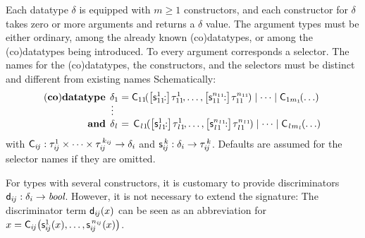 \newcommand\elll{\kern.18ex l\kern.11ex}
\newcommand\elllx{\kern.11ex l\kern.18ex}

Each datatype $\delta$ is equipped with
$m \ge 1$ constructors, and each constructor for $\delta$ takes zero or more
arguments and returns a $\delta$ value. The argument types must be either
ordinary, among the already known (co)datatypes, or among the (co)datatypes
being introduced.
%
To every argument corresponds a selector. The names for the (co)data\-types, the
constructors, and the selectors must be distinct and different from
existing names%
Schematically:
%
\[
\begin{aligned}[t]
\!(\keyw{co})\keyw{datatype}\;\,
  \delta_1 & {}= \smash{\const{C}_{11\!}(\bigl[\const{s}_{11\!}^1{:}\bigr]\vthinspace \tau_{11\!}^1, \ldots, \bigl[\const{s}_{11\!}^{n_{11\!}}{:}\bigr]\vthinspace \tau_{11\!}^{n_{11\!}})} \mid \cdots \mid \smash{\const{C}_{1m_1\!}(\ldots)} \\
   \smash{\vdots\,\,\,} \\[-1\jot]
  \keyw{and}\; \,\delta_{\elllx} & =\, \smash{\const{C}_{\elll 1\!}(\bigl[\const{s}_{\elll 1\!}^1{:}\bigr]\vthinspace \tau_{\elll 1\!}^1, \ldots, \bigl[\const{s}_{\elll 1\!}^{n_{\elll 1\!}}{:}\bigr]\vthinspace \tau_{\elll 1\!}^{n_{\elll 1\!}})} \mid \cdots \mid \smash{\const{C}_{\elll m_{\elllx}\!}(\ldots)}
\end{aligned}
\]
%
with
$\textsf{C}_{i\kern-0.083333em j} : \tau_{i\kern-0.083333em j}^1\times\cdots\times\tau_{i\kern-0.083333em j}^{\,k_{\smash{i\kern-0.083333em j}}} \to \delta_i$
and $\textsf{s}_{i\kern-0.083333em j}^{\,k} : \delta_i \to \tau_{i\kern-0.083333em j}^{\,k}$. Defaults are assumed for
the selector names if they are omitted.

For types with several constructors, it is customary to provide discriminators
$\textsf{d}_{i\kern-0.083333em j} : \delta_i \to \textit{bool}$. However,
it is not necessary to extend the signature:
The discriminator term $\textsf{d}_{i\kern-0.083333em j}(x)$ can be seen as an abbreviation for
$x = \textsf{C}_{i\kern-0.083333em j}\bigl(\textsf{s}_{i\kern-0.083333em j}^1(x), \ldots, \textsf{s}_{i\kern-0.083333em j}^{\,n_{\smash{{i\kern-0.083333em j}}}}(x)\bigr)$.

